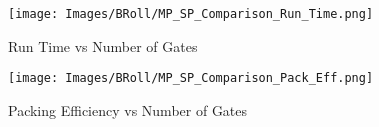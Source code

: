 \documentclass[12pt, a4paper,openany]{article}
\begin{document}
\newpage
\begin{figure}[ht]
    \centering
    \begin{minipage}{1.0\linewidth}
        \centering
        \texttt{[image: Images/BRoll/MP\_SP\_Comparison\_Run\_Time.png]}
        \label{fig:mp-sp-runtime}
        \caption{Run Time vs Number of Gates}    
    \end{minipage}
    \begin{minipage}{1.0\linewidth}
        \centering
        \texttt{[image: Images/BRoll/MP\_SP\_Comparison\_Pack\_Eff.png]}
        \label{fig:mp-sp-peff}
        \caption{Packing Efficiency vs Number of Gates}    
    \end{minipage}
\end{figure}
\end{document}
